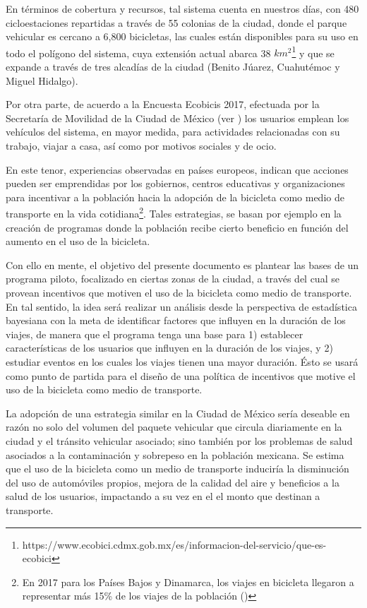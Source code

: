 \documentclass[9pt,twocolumn,twoside]{ilcss}
\begin{document}
En términos de cobertura y recursos, tal sistema cuenta en nuestros días, con 480 cicloestaciones repartidas a través de 55 colonias de la ciudad, donde el parque vehicular es cercano a 6,800 bicicletas, las cuales están disponibles para su uso en todo el polígono del sistema, cuya extensión actual abarca 38 $km^2$\footnote{https://www.ecobici.cdmx.gob.mx/es/informacion-del-servicio/que-es-ecobici} y que se expande a través de tres alcadías de la ciudad (Benito Júarez, Cuahutémoc y Miguel Hidalgo).

Por otra parte, de acuerdo a la Encuesta Ecobicis 2017, efectuada por la Secretaría de Movilidad de la Ciudad de México (ver \cite{Ecobicis2017}) los usuarios emplean los vehículos del sistema, en mayor medida, para actividades relacionadas con su trabajo, viajar a casa, así como por motivos sociales y de ocio.

En este tenor, experiencias observadas en países europeos, indican que acciones pueden ser emprendidas por los gobiernos, centros educativas y organizaciones para incentivar a la población hacia la adopción de la bicicleta como medio de transporte en la vida cotidiana\footnote{En 2017 para los Países Bajos y Dinamarca, los viajes en bicicleta llegaron a representar más 15\% de los viajes de la población (\cite{Netherlands2017})}. Tales estrategias, se basan por ejemplo en la creación de programas donde la población recibe cierto beneficio en función del aumento en el uso de la bicicleta. 

Con ello en mente, el objetivo del presente documento es plantear las bases de un programa piloto, focalizado en ciertas zonas de la ciudad, a través del cual se provean incentivos que motiven el uso de la bicicleta como medio de transporte. En tal sentido, la idea será realizar un análisis desde la perspectiva de estadística bayesiana con la meta de identificar factores que influyen en la duración de los viajes, de manera que el programa tenga una base para 1) establecer características de los usuarios que influyen en la duración de los viajes, y 2) estudiar eventos en los cuales los viajes tienen una mayor duración. Ésto se usará como punto de partida para el diseño de una política de incentivos que motive el uso de la bicicleta como medio de transporte.

La adopción de una estrategia similar en la Ciudad de México sería deseable en razón no solo del volumen del paquete vehicular que circula diariamente en la ciudad y el tránsito vehicular asociado; sino también por los problemas de salud asociados a la contaminación y sobrepeso en la población mexicana. Se estima que el uso de la bicicleta como un medio de transporte induciría la disminución del uso de automóviles propios, mejora de la calidad del aire y beneficios a la salud de los usuarios, impactando a su vez en el el monto que destinan a transporte.
\end{document}
